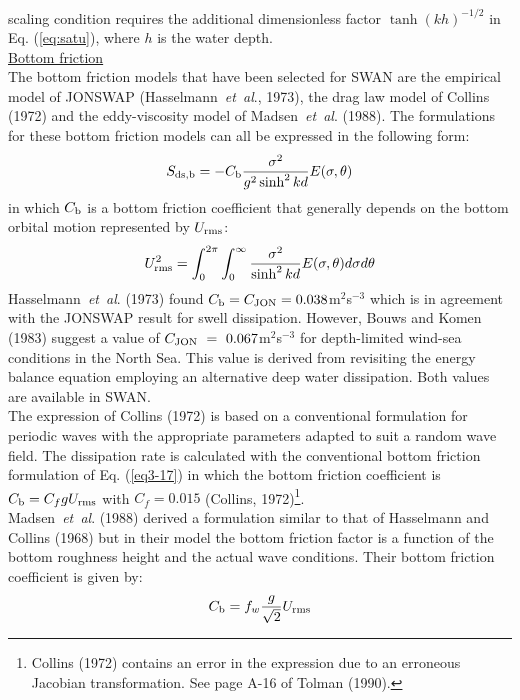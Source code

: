 \documentclass[12pt]{book}
\begin{document}
scaling condition requires the additional dimensionless factor ${\tanh(kh)}^{-1/2}$ in Eq. (\ref{eq:satu}), where $h$ is the water depth.
\nocite{Res04LV}
\\[2ex]
\noindent
\underline{Bottom friction}\\[2ex]
The bottom friction models that have been selected for SWAN are the empirical model of JONSWAP
(Hasselmann~{\it et~al}., 1973), the drag law model of Collins (1972) and the eddy-viscosity model of
Madsen~{\it et~al}. (1988). The formulations for these bottom friction models can all be expressed in the following form:
\begin{equation}
  S_{\rm ds,b} = -C_{\rm b} \frac{\sigma^2}{g^2 \sinh^2 kd} E (\sigma,\theta)
  \label{eq3-17}
\end{equation}
in which $C_{\rm b}$ is a bottom friction coefficient that generally depends on the bottom orbital motion
represented by $U_{\rm rms}$:
\begin{equation}
  U^2_{\rm rms} = \int_{0}^{2\pi} \int_{0}^{\infty} \frac{\sigma^2}{\sinh^2 kd} E(\sigma,\theta) d\sigma d\theta
  \label{eq3-18}
\end{equation}
Hasselmann~{\it et~al}. (1973) found $C_{\rm b}=C_{\rm JON}=0.038$m$^{2}$s$^{-3}$ which is in
agreement with the JONSWAP result for swell dissipation. However, Bouws and Komen (1983) suggest a
value of $C_{\rm JON}~=~0.067$m$^{2}$s$^{-3}$ for depth-limited wind-sea conditions in the North Sea. This value is derived
from revisiting the energy balance equation employing an alternative deep water dissipation.
Both values are available in SWAN.
\\[2ex]
\noindent
The expression of Collins (1972) is based on a conventional formulation for periodic waves with the
appropriate parameters adapted to suit a random wave field. The dissipation rate is calculated with the
conventional bottom friction formulation of Eq. (\ref{eq3-17}) in which the bottom friction coefficient is
$C_{\rm b} = C_f g U_{\rm rms}$ with $C_f = 0.015$ (Collins, 1972)\footnote{Collins (1972) contains
an error in the expression due to an erroneous Jacobian transformation. See page A-16 of Tolman (1990).}.
\\[2ex]
\noindent
Madsen~{\it et~al}. (1988) derived a formulation similar to that of Hasselmann and Collins (1968) but in their
model the bottom friction factor is a function of the bottom roughness height and the actual wave
conditions. Their bottom friction coefficient is given by:
\begin{equation}
  C_{\rm b} = f_w \frac{g}{\sqrt{2}} U_{\rm rms}
  \label{eq3-19}
\end{equation}
\end{document}
